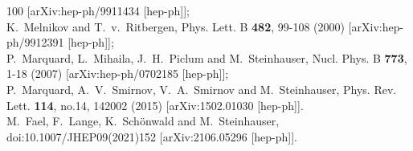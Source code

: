 \documentclass[Physsubmission, Phys]{SciPost}
\begin{document}
\begin{thebibliography}{100}
[arXiv:hep-ph/9911434 [hep-ph]];\\
K.~Melnikov and T.~v.~Ritbergen,
Phys. Lett. B \textbf{482}, 99-108 (2000)
[arXiv:hep-ph/9912391 [hep-ph]];\\
P.~Marquard, L.~Mihaila, J.~H.~Piclum and M.~Steinhauser,
Nucl. Phys. B \textbf{773}, 1-18 (2007)
[arXiv:hep-ph/0702185 [hep-ph]];\\
P.~Marquard, A.~V.~Smirnov, V.~A.~Smirnov and M.~Steinhauser,
Phys. Rev. Lett. \textbf{114}, no.14, 142002 (2015)
[arXiv:1502.01030 [hep-ph]].\\
M.~Fael, F.~Lange, K.~Sch\"onwald and M.~Steinhauser,
doi:10.1007/JHEP09(2021)152
[arXiv:2106.05296 [hep-ph]].


\end{thebibliography}
\end{document}
